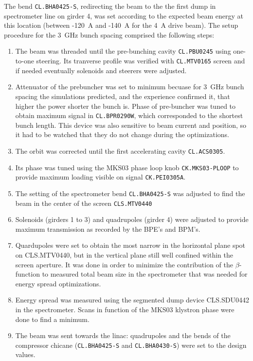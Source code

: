 The bend \texttt{CL.BHA0425-S}, redirecting the beam to the the first dump in spectrometer line on girder 4, 
was set according to the expected beam energy at this location (between -120~A and -140~A for the 4~A drive beam).
The setup procedure for the 3~GHz bunch spacing comprised the following steps:
\begin{enumerate}
\item 
The beam was threaded until the pre-bunching cavity \texttt{CL.PBU0245} using one-to-one steering. 
Its tranverse profile was verified with \texttt{CL.MTV0165} screen and if needed eventually solenoids and steerers were adjusted. 
\item
Attenuator of the prebuncher was set to minimum becuase 
for 3~GHz bunch spacing the simulations predicted, and the experience confirmed it, 
that higher the power shorter the bunch is.
Phase of pre-buncher was tuned to obtain maximum %
signal in \texttt{CL.BPR0290W}, which corresponded to the shortest bunch length.
This device was also sensitive to beam current and position, so it had to be watched that they do not change during the optimizations.
\item 
The orbit was corrected until the first accelerating cavity \texttt{CL.ACS0305}.
\item 
Its phase was tuned using the MKS03 phase loop knob \texttt{CK.MKS03-PLOOP} to provide maximum loading visible on signal \texttt{CK.PEI0305A}.
\item 
The setting of the spectrometer bend \texttt{CL.BHA0425-S} was adjusted to find the beam in the center of the screen \texttt{CLS.MTV0440}
\item
Solenoids (girders 1 to 3) and quadrupoles (girder 4) were adjusted to provide maximum transmission 
as recorded by the BPE's and BPM's.
\item
Quardupoles were set to obtain the most narrow in the horizontal plane spot on CLS.MTV0440, 
but in the vertical plane still well confined within the screen aperture. 
It was done in order to minimize the contribution of the $\beta$-function to 
measured total beam size in the spectrometer that was needed for energy spread optimizations.
\item
Energy spread was measured using the segmented dump device CLS.SDU0442 in the spectrometer. 
Scans in function of the MKS03 klystron phase were done to find a minimum.
\item
The beam was sent towards the linac: quadrupoles and the bends of the compressor chicane 
(\texttt{CL.BHA0425-S} and \texttt{CL.BHA0430-S}) were set to the design values.

\end{enumerate}
